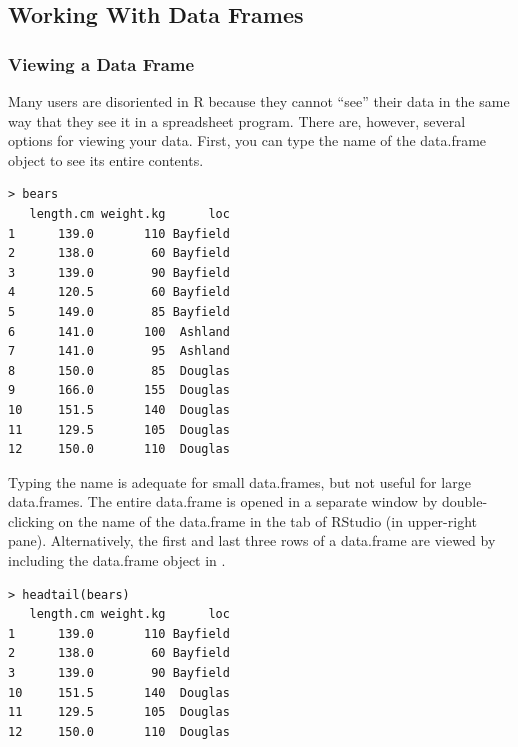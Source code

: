 \documentclass[10pt,openany]{book}\usepackage[]{graphicx}\usepackage[]{color}
\makeatletter
\newenvironment{kframe}{%
 \def\at@end@of@kframe{}%
 \ifinner\ifhmode%
  \def\at@end@of@kframe{\end{minipage}}%
  \begin{minipage}{\columnwidth}%
 \fi\fi%
 \def\FrameCommand##1{\hskip\@totalleftmargin \hskip-\fboxsep
 \colorbox{shadecolor}{##1}\hskip-\fboxsep
     \hskip-\linewidth \hskip-\@totalleftmargin \hskip\columnwidth}%
 \MakeFramed {\advance\hsize-\width
   \@totalleftmargin\z@ \linewidth\hsize
   \@setminipage}}%
 {\par\unskip\endMakeFramed%
 \at@end@of@kframe}
\newenvironment{knitrout}{}{} %
\makeatother
\begin{document}
\vspace{24pt}
\subsection{Working With Data Frames}  \label{sect:RWorkdf}
\subsubsection{Viewing a Data Frame}  \label{sect:RViewdf}
Many users are disoriented in R because they cannot ``see'' their data in the same way that they see it in a spreadsheet program. There are, however, several options for viewing your data. First, you can type the name of the data.frame object to see its entire contents.
\begin{knitrout}
\color{fgcolor}\begin{kframe}
\begin{verbatim}
> bears
   length.cm weight.kg      loc
1      139.0       110 Bayfield
2      138.0        60 Bayfield
3      139.0        90 Bayfield
4      120.5        60 Bayfield
5      149.0        85 Bayfield
6      141.0       100  Ashland
7      141.0        95  Ashland
8      150.0        85  Douglas
9      166.0       155  Douglas
10     151.5       140  Douglas
11     129.5       105  Douglas
12     150.0       110  Douglas
\end{verbatim}
\end{kframe}
\end{knitrout}

Typing the name is adequate for small data.frames, but not useful for large data.frames. The entire data.frame is opened in a separate window by double-clicking on the name of the data.frame in the  tab of RStudio (in upper-right pane). Alternatively, the first and last three rows of a data.frame are viewed by including the data.frame object in .
\begin{knitrout}
\color{fgcolor}\begin{kframe}
\begin{verbatim}
> headtail(bears)
   length.cm weight.kg      loc
1      139.0       110 Bayfield
2      138.0        60 Bayfield
3      139.0        90 Bayfield
10     151.5       140  Douglas
11     129.5       105  Douglas
12     150.0       110  Douglas
\end{verbatim}
\end{kframe}
\end{knitrout}
\end{document}
